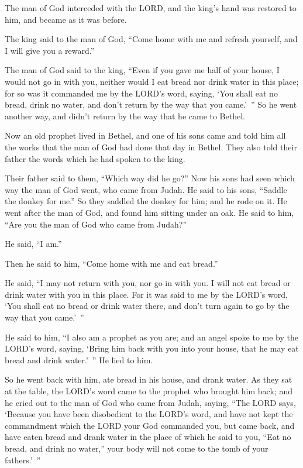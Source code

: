 The man of God interceded with the LORD, and the king’s hand was restored to him, and became
as it was before.

\myverse{}The king said to the man of God, “Come home with me and refresh
yourself, and I will give you a reward.”

\myverse{}The man of God said to the king, “Even if you gave me half of
your house, I would not go in with you, neither would I eat bread nor drink water in this place;
\myverse{}for so was it commanded me by the LORD’s word, saying, ‘You shall eat no bread,
drink no water, and don’t return by the way that you came.’ ”
\myverse{}So he went another way, and didn’t return by the way that he came to Bethel.

\myverse{}Now an old prophet lived in Bethel, and one of his sons came
and told him all the works that the man of God had done that day in Bethel. They also told their father
the words which he had spoken to the king.

\myverse{}Their father said to them, “Which way did he go?” Now his sons
had seen which way the man of God went, who came from Judah.
\myverse{}He said to his sons, “Saddle the donkey for me.” So they saddled the donkey
for him; and he rode on it.
\myverse{}He went after the man of God, and found him sitting under an oak. He said
to him, “Are you the man of God who came from Judah?”

He said, “I am.”

\myverse{}Then he said to him, “Come home with me and eat bread.”

\myverse{}He said, “I may not return with you, nor go in with you. I will
not eat bread or drink water with you in this place.
\myverse{}For it was said to me by the LORD’s word, ‘You shall eat no bread or drink
water there, and don’t turn again to go by the way that you came.’ ”

\myverse{}He said to him, “I also am a prophet as you are; and an angel
spoke to me by the LORD’s word, saying, ‘Bring him back with you into your house, that he may eat bread
and drink water.’ ” He lied to him.

\myverse{}So he went back with him, ate bread in his house, and drank
water.
\myverse{}As they sat at the table, the LORD’s word came to the prophet who brought
him back;
\myverse{}and he cried out to the man of God who came from Judah, saying, “The LORD
says, ‘Because you have been disobedient to the LORD’s word, and have not kept the commandment which the
LORD your God commanded you,
\myverse{}but came back, and have eaten bread and drank water in the place of which
he said to you, “Eat no bread, and drink no water,” your body will not come to the tomb of your fathers.’ ”

